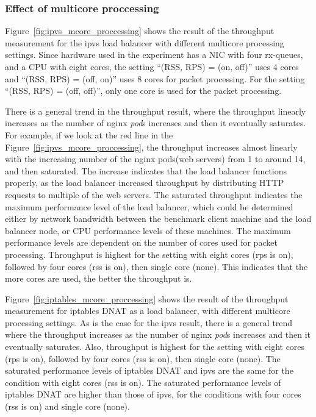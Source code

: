 \FloatBarrier

\subsubsection{Effect of multicore proccessing}

Figure~\ref{fig:ipvs_mcore_proccessing} shows the result of the throughput measurement for the ipvs load balancer with different multicore processing settings.
Since hardware used in the experiment has a NIC with four rx-queues, and a CPU with eight cores,
the setting \enquote{(RSS, RPS) = (on, off)} uses 4 cores and \enquote{(RSS, RPS) = (off, on)} uses 8 cores for packet processing.
For the setting \enquote{(RSS, RPS) = (off, off)}, only one core is used for the packet processing.

There is a general trend in the throughput result, where the throughput linearly increases as the number of nginx {\em pod}s increases and then it eventually saturates.
For example, if we look at the red line in the Figure~\ref{fig:ipvs_mcore_proccessing}, the throughput increases almost linearly with the increasing number of the nginx pods(web servers) from 1 to around 14, and then saturated.
The increase indicates that the load balancer functions properly, as the load balancer increased throughput by distributing HTTP requests to multiple of the web servers.
%
The saturated throughput indicates the maximum performance level of the load balancer, which could be determined either by network bandwidth between the benchmark client machine and the load balancer node, or CPU performance levels of these machines.
%
The maximum performance levels are dependent on the number of cores used for packet processing.
Throughput is highest for the setting with eight cores (rps is on), followed by four cores (rss is on), then single core (none).
This indicates that the more cores are used, the better the throughput is.

Figure~\ref{fig:iptables_mcore_proccessing} shows the result of the throughput measurement for iptables DNAT as a load balancer, with different multicore processing settings.
As is the case for the ipvs result, there is a general trend where the throughput increases as the number of nginx {\em pod}s increases and then it eventually saturates.
Also, throughput is highest for the setting with eight cores (rps is on), followed by four cores (rss is on), then single core (none).
%
The saturated performance levels of iptables DNAT and ipvs are the same for the condition with eight cores (rss is on). 
The saturated performance levels of iptables DNAT are higher than those of ipvs, for the conditions with four cores (rss is on) and single core (none).

